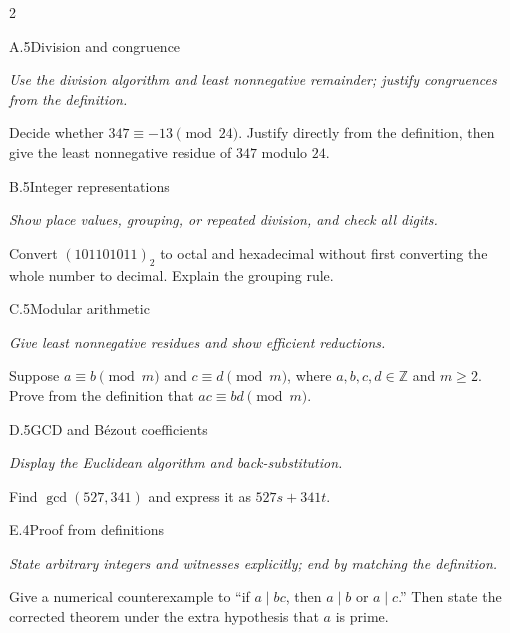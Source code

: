 \documentclass[9pt]{extarticle}
\begin{document}
\begin{multicols}{2}
\begin{CoreProblem}{A.5}{Division and congruence}
{\scriptsize\textit{Use the division algorithm and least nonnegative remainder; justify congruences from the definition.}\par}
Decide whether $347\equiv-13\pmod{24}$. Justify directly from the definition,
then give the least nonnegative residue of $347$ modulo $24$.
\end{CoreProblem}
\begin{CoreProblem}{B.5}{Integer representations}
{\scriptsize\textit{Show place values, grouping, or repeated division, and check all digits.}\par}
Convert $(101101011)_2$ to octal and hexadecimal without first converting the
whole number to decimal. Explain the grouping rule.
\end{CoreProblem}
\begin{CoreProblem}{C.5}{Modular arithmetic}
{\scriptsize\textit{Give least nonnegative residues and show efficient reductions.}\par}
Suppose $a\equiv b\pmod m$ and $c\equiv d\pmod m$, where
$a,b,c,d\in\mathbb Z$ and $m\ge2$. Prove from the definition that
$ac\equiv bd\pmod m$.
\end{CoreProblem}
\columnbreak
\begin{CoreProblem}{D.5}{GCD and B\'ezout coefficients}
{\scriptsize\textit{Display the Euclidean algorithm and back-substitution.}\par}
Find $\gcd(527,341)$ and express it as $527s+341t$.
\end{CoreProblem}
\begin{CoreProblem}{E.4}{Proof from definitions}
{\scriptsize\textit{State arbitrary integers and witnesses explicitly; end by matching the definition.}\par}
Give a numerical counterexample to ``if $a\mid bc$, then $a\mid b$ or
$a\mid c$.'' Then state the corrected theorem under the extra hypothesis that
$a$ is prime.
\end{CoreProblem}
\end{multicols}
\CoreWorkArea
\FormBreak
{}
\end{document}
